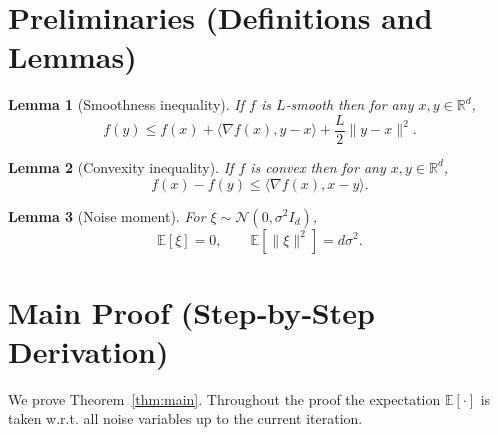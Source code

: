 \documentclass{article}
\newtheorem{lemma}{Lemma}
\newcommand{\E}{\mathbb{E}}
\newcommand{\R}{\mathbb{R}}
\begin{document}
\newpage
\section*{Preliminaries (Definitions and Lemmas)}
\begin{lemma}[Smoothness inequality]\label{lem:smooth}
If $f$ is $L$‑smooth then for any $x,y\in\R^{d}$,
\[
f(y) \le f(x)+\langle\nabla f(x),y-x\rangle+\frac{L}{2}\|y-x\|^2 .
\]
\end{lemma}
\begin{lemma}[Convexity inequality]\label{lem:convex}
If $f$ is convex then for any $x,y\in\R^{d}$,
\[
f(x)-f(y)\le\langle\nabla f(x),x-y\rangle .
\]
\end{lemma}
\begin{lemma}[Noise moment]\label{lem:noise}
For $\xi\sim\mathcal N(0,\sigma^2 I_d)$,
\[
\E[\xi]=0,\qquad \E[\|\xi\|^2]=d\sigma^2 .
\]
\end{lemma}

\section*{Main Proof (Step‑by‑Step Derivation)}
We prove Theorem~\ref{thm:main}.  Throughout the proof the expectation $\E[\cdot]$ is taken w.r.t. all noise variables up to the current iteration.
\end{document}
